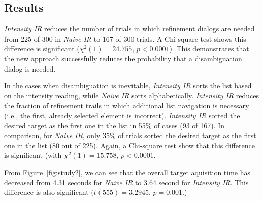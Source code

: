 






\subsection{Results}
{\em Intensity IR} reduces the number of trials in which refinement dialogs are needed from 225 of 300 in {\em Naive IR} to 167 of 300 trials. A Chi-square test shows this difference is significant ($\chi^2(1) = 24.755$, $p < 0.0001$). This demonstrates that the new approach successfully reduces the probability that a disambiguation dialog is needed.

In the cases when disambiguation is inevitable, {\em Intensity IR} sorts the list based on the intensity reading, while {\em Naive IR} sorts alphabetically. {\em Intensity IR} reduces the fraction of refinement trails in which additional list navigation is necessary (i.e., the first, already selected element is incorrect).  {\em Intensity IR} sorted the desired target as the first one in the list in 55\% of cases (93 of 167). In comparison, for {\em Naive IR}, only 35\% of trials sorted the desired target as the first one in the list (80 out of 225). Again, a Chi-square test show that this difference is significant (with $\chi^2(1) = 15.758$, $p < 0.0001$. 

From Figure~\ref{fig:study2}, we can see that the overall target aquisition time has decreased from 4.31 seconds for {\em Naive IR} to 3.64 second for {\em Intensity IR}. This difference is also significant ($t(555)=3.2945$, $p=0.001$.) 





